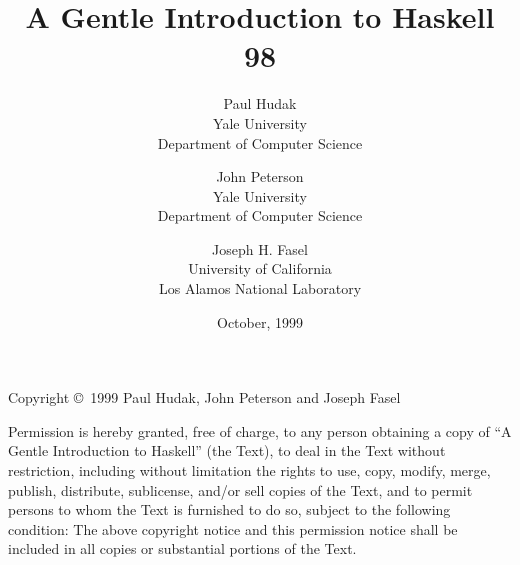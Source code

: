 \documentclass[twoside,11pt]{article}
\begin{document}
\title{A Gentle Introduction to Haskell 98}
\author{Paul Hudak\\
Yale University\\
Department of Computer Science  
\and
John Peterson\\
Yale University\\
Department of Computer Science  
\and
Joseph H. Fasel\\
University of California\\
Los Alamos National Laboratory}
\date{October, 1999}

\maketitle

Copyright \copyright\ 1999 Paul Hudak, John Peterson and Joseph Fasel

     Permission is hereby granted, free of charge, to any person obtaining
     a copy of ``A Gentle Introduction to Haskell'' (the Text), to deal
     in the Text without restriction, including without limitation the
     rights to use, copy, modify, merge, publish, distribute, sublicense,
     and/or sell copies of the Text, and to permit persons to whom the
     Text is furnished to do so, subject to the following condition:
     The above copyright notice and this permission notice shall be
     included in all copies or substantial portions of the Text.



















\end{document}
